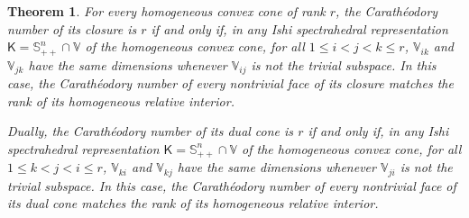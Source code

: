 \documentclass[oneside]{amsart}
\theoremstyle{plain}
\newtheorem{theorem}{Theorem}[section]
\theoremstyle{definition}
\theoremstyle{remark}
\numberwithin{equation}{section}
\begin{document}
\begin{theorem}\label{theorem:characterizationofrankmatchingcaratheodorynumber}
For every homogeneous convex cone of rank $r$, the Carath\'eodory number of
its closure is $r$ if and only if, in any Ishi spectrahedral representation
$\mathsf{K} = \mathbb{S}^{n}_{++} \cap \mathbb{V}$ of the homogeneous
convex cone, for all $1 \leq i < j < k \leq r$, $\mathbb{V}_{ik}$ and
$\mathbb{V}_{jk}$ have the same dimensions whenever $\mathbb{V}_{ij}$ is
not the trivial subspace. In this case, the Carath\'eodory number of every
nontrivial face of its closure matches the rank of its homogeneous relative
interior.

Dually, the Carath\'eodory number of its dual cone is $r$ if and only if,
in any Ishi spectrahedral representation $\mathsf{K} = \mathbb{S}^{n}_{++}
\cap \mathbb{V}$ of the homogeneous convex cone, for all $1 \leq k < j < i
\leq r$, $\mathbb{V}_{ki}$ and $\mathbb{V}_{kj}$ have the same dimensions
whenever $\mathbb{V}_{ji}$ is not the trivial subspace. In this case, the
Carath\'eodory number of every nontrivial face of its dual cone matches the
rank of its homogeneous relative interior.
\end{theorem}
\end{document}

